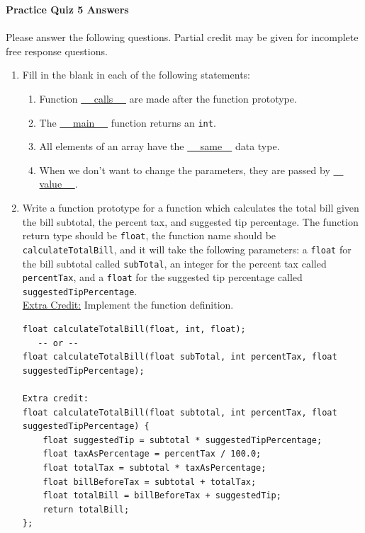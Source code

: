 \documentclass[letter,11pt]{article}
\begin{document}
\huge
\textbf{Practice Quiz 5 Answers}
\normalsize

\paragraph{}Please answer the following questions. Partial credit may be given for incomplete free response questions.

\begin{enumerate}
    \item Fill in the blank in each of the following statements:
    \begin{enumerate}
        \item Function \underline{~~ calls ~~} are made after the function prototype.
        \item The \underline{~~ main ~~} function returns an \texttt{int}.
        \item All elements of an array have the \underline{~~ same~~} data type.
        \item When we don't want to change the parameters, they are passed by \underline{~~ value ~~}.
    \end{enumerate}
    
    \item Write a function prototype for a function which calculates the total bill given the bill subtotal, the percent tax, and suggested tip percentage. The function return type should be \texttt{float}, the function name should be \texttt{calculateTotalBill}, and it will take the following parameters: a \texttt{float} for the bill subtotal called \texttt{subTotal}, an integer for the percent tax called \texttt{percentTax}, and a \texttt{float} for the suggested tip percentage called \texttt{suggestedTipPercentage}. \\
    \underline{Extra Credit:} Implement the function definition.
    
    \begin{verbatim}
float calculateTotalBill(float, int, float);
   -- or --
float calculateTotalBill(float subTotal, int percentTax, float suggestedTipPercentage);

Extra credit:
float calculateTotalBill(float subtotal, int percentTax, float suggestedTipPercentage) {
    float suggestedTip = subtotal * suggestedTipPercentage;
    float taxAsPercentage = percentTax / 100.0;
    float totalTax = subtotal * taxAsPercentage;
    float billBeforeTax = subtotal + totalTax;
    float totalBill = billBeforeTax + suggestedTip;
    return totalBill;
};
    \end{verbatim}
    

\end{enumerate}
\end{document}
